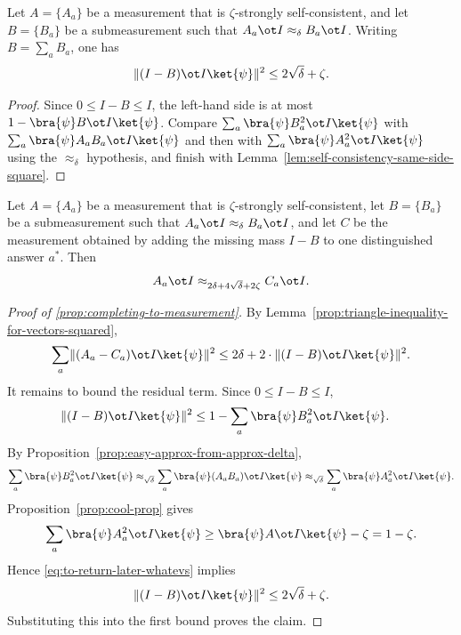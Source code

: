 \begin{lemma}\label{lem:completion-missing-mass-bound}
	\leanok
	Let $A=\{A_a\}$ be a measurement that is $\zeta$-strongly self-consistent, and let $B=\{B_a\}$ be a submeasurement such that $A_a \ot I \approx_\delta B_a \ot I$. Writing $B=\sum_a B_a$, one has
	\[
		\lVert (I-B) \ot I\ket{\psi} \rVert^2 \le 2\sqrt\delta + \zeta.
	\]
\end{lemma}
\begin{proof}
	\leanok
	Since $0 \le I-B \le I$, the left-hand side is at most $1-\bra{\psi} B \ot I \ket{\psi}$. Compare $\sum_a \bra{\psi} B_a^2 \ot I \ket{\psi}$ with $\sum_a \bra{\psi} A_a B_a \ot I \ket{\psi}$ and then with $\sum_a \bra{\psi} A_a^2 \ot I \ket{\psi}$ using the $\approx_\delta$ hypothesis, and finish with Lemma~\ref{lem:self-consistency-same-side-square}.
\end{proof}

\begin{lemma}\label{prop:completing-to-measurement}
	\leanok
	Let $A=\{A_a\}$ be a measurement that is $\zeta$-strongly self-consistent, let $B=\{B_a\}$ be a submeasurement such that $A_a \ot I \approx_\delta B_a \ot I$, and let $C$ be the measurement obtained by adding the missing mass $I-B$ to one distinguished answer $a^*$. Then
	\[
		A_a \ot I \approx_{2\delta + 4\sqrt\delta + 2\zeta} C_a \ot I.
	\]
\end{lemma}
\begin{proof}[Proof of \ref{prop:completing-to-measurement}]
	\leanok
	By Lemma~\ref{prop:triangle-inequality-for-vectors-squared},
	\[
		\sum_a \lVert(A_a-C_a)\ot I \ket{\psi} \rVert^2
		\leq 2\delta + 2 \cdot \lVert(I-B)\ot I \ket{\psi}\rVert^2.
	\]
	It remains to bound the residual term. Since $0 \le I-B \le I$,
	\begin{align}
		\lVert(I-B) \ot I \ket{\psi}\rVert^2
		 & \leq 1 -\sum_a \bra{\psi} B_a^2 \ot I \ket{\psi}.
		\label{eq:to-return-later-whatevs}
	\end{align}
	By Proposition~\ref{prop:easy-approx-from-approx-delta},
	\[
		\sum_a \bra{\psi} B_a^2 \ot I \ket{\psi}
		\approx_{\sqrt{\delta}} \sum_a \bra{\psi} (A_a B_a)\ot I \ket{\psi}
		\approx_{\sqrt{\delta}} \sum_a \bra{\psi} A_a^2\ot I \ket{\psi}.
	\]
	Proposition~\ref{prop:cool-prop} gives
	\[
		\sum_a \bra{\psi} A_a^2\ot I \ket{\psi} \geq \bra{\psi} A \ot I \ket{\psi} - \zeta = 1-\zeta.
	\]
	Hence \eqref{eq:to-return-later-whatevs} implies
	\[
		\lVert(I-B) \ot I \ket{\psi}\rVert^2 \le 2\sqrt\delta + \zeta.
	\]
	Substituting this into the first bound proves the claim.
\end{proof}

